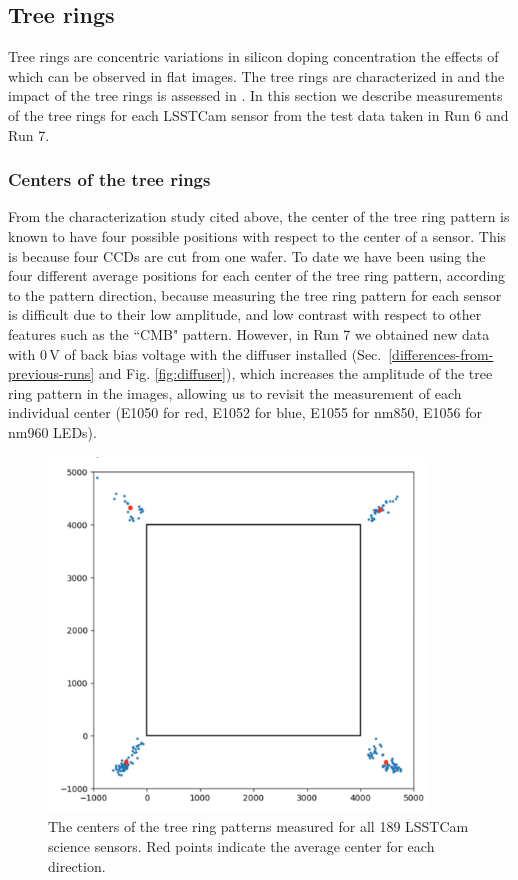 \subsection{Tree rings}\label{tree-rings}
Tree rings are concentric variations in silicon doping concentration the effects of which can be observed in flat images. The tree rings are characterized in \citet{2017Jinst..12C05015,2020JATIS...6a1005P} and the impact of the tree rings is assessed in \citet{2023PASP..135k5003E}. In this section we describe measurements of the tree rings for each LSSTCam sensor from the test data taken in Run 6 and Run 7.
\subsubsection{Centers of the tree rings}
From the characterization study cited above, the center of the tree ring pattern is known to have four possible positions with respect to the center of a sensor. This is because four CCDs are cut from one wafer.
To date we have been using the four different average positions for each center of the tree ring pattern, according to the pattern direction, because measuring the tree ring pattern for each sensor is difficult due to their low amplitude, and low contrast with respect to other features such as the ``CMB" pattern. However, in Run 7 we obtained new data with 0\,V of back bias voltage with the diffuser installed (Sec.~\ref{differences-from-previous-runs} and Fig. \ref{fig:diffuser}), which increases the amplitude of the tree ring pattern in the images, allowing us to revisit the measurement of each individual center (E1050 for red, E1052 for blue, E1055 for nm850, E1056 for nm960 LEDs).

\begin{figure}[ht]
\begin{centering}
\includegraphics[width=0.9\textwidth]{figures/TR_centers.png}
\end{centering}
\caption{The centers of the tree ring patterns measured for all 189 LSSTCam science sensors. Red points indicate the average center for each direction.}
\label{fig:tree_ring_center}
\end{figure}

